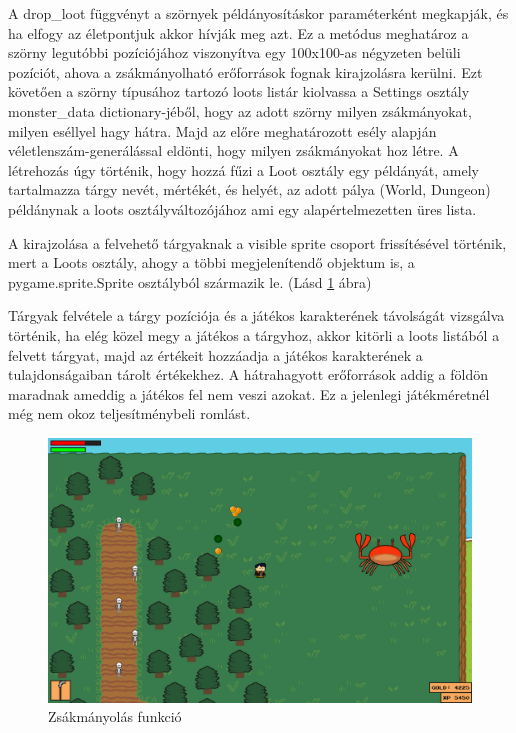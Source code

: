 A drop\_loot függvényt a szörnyek példányosításkor paraméterként megkapják, és ha elfogy az életpontjuk akkor hívják meg azt.
 Ez a metódus meghatároz a szörny legutóbbi pozíciójához viszonyítva egy 100x100-as négyzeten belüli pozíciót,
  ahova a zsákmányolható erőforrások fognak kirajzolásra kerülni.
   Ezt követően a szörny típusához tartozó loots listár kiolvassa a Settings osztály monster\_data dictionary-jéből,
    hogy az adott szörny milyen zsákmányokat, milyen eséllyel hagy hátra.
     Majd az előre meghatározott esély alapján véletlenszám-generálással eldönti,
      hogy milyen zsákmányokat hoz létre. A létrehozás úgy történik,
       hogy hozzá fűzi a Loot osztály egy példányát, amely tartalmazza tárgy nevét, mértékét, és helyét,  az adott pálya (World, Dungeon) példánynak a loots osztályváltozójához ami egy alapértelmezetten üres lista. 

A kirajzolása a felvehető tárgyaknak a visible sprite csoport frissítésével történik,
 mert a Loots osztály, ahogy a többi megjelenítendő objektum is, a pygame.sprite.Sprite osztályból származik le. (Lásd \ref{fig:Zsákmányolás funkció} ábra)

Tárgyak felvétele a tárgy pozíciója és a játékos karakterének távolságát vizsgálva történik,
 ha elég közel megy a játékos a tárgyhoz, akkor kitörli a loots listából a felvett tárgyat, majd az értékeit hozzáadja
  a játékos karakterének a tulajdonságaiban tárolt értékekhez.
   A hátrahagyott erőforrások addig a földön maradnak ameddig a játékos fel nem veszi azokat.
    Ez a jelenlegi játékméretnél még nem okoz teljesítménybeli romlást. 

\begin{figure}[H]
    \centering
    \includegraphics[width=14truecm]{images/loots.png}
    \caption{Zsákmányolás funkció}
    \label{fig:Zsákmányolás funkció}
\end{figure}

